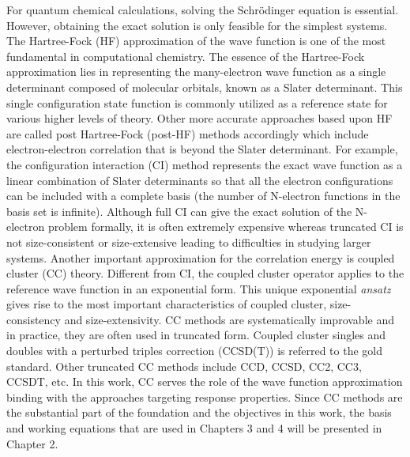 For quantum chemical calculations, solving the Schr\"odinger equation is essential. However, obtaining the exact solution is only feasible for the simplest systems. The Hartree-Fock (HF)\cite{Slater1951, Szabo2012} approximation of the wave function is one of the most fundamental in computational chemistry. The essence of the Hartree-Fock approximation lies in representing the many-electron wave function as a single determinant composed of molecular orbitals, known as a Slater determinant. This single configuration state function is commonly utilized as a reference state for various higher levels of theory. Other more accurate approaches based upon HF are called post Hartree-Fock (post-HF) methods accordingly which include electron-electron correlation that is beyond the Slater determinant. For example, the configuration interaction (CI) method\cite{Sherrill1999} represents the exact wave function as a linear combination of Slater determinants so that all the electron configurations can be included with a complete basis (the number of N-electron functions in the basis set is infinite). Although full CI can give the exact solution of the N-electron problem formally, it is often extremely expensive whereas truncated CI is not size-consistent or size-extensive leading to difficulties in studying larger systems. Another important approximation for the correlation energy is coupled cluster (CC) theory.\cite{Crawford2000} Different from CI, the coupled cluster operator applies to the reference wave function in an exponential form. This unique exponential \textit{ansatz} gives rise to the most important characteristics of coupled cluster, size-consistency and size-extensivity. CC methods are systematically improvable and in practice, they are often used in truncated form. Coupled cluster singles and doubles with a perturbed triples correction (CCSD(T))\cite{Purvis1982} is referred to the gold standard. Other truncated CC methods include CCD, CCSD, CC2,\cite{Christiansen1995} CC3,\cite{Koch1997} CCSDT, etc. In this work, CC serves the role of the wave function approximation binding with the approaches targeting response properties. Since CC methods are the substantial part of the foundation and the objectives in this work, the basis and working equations that are used in Chapters 3 and 4 will be presented in Chapter 2. 

